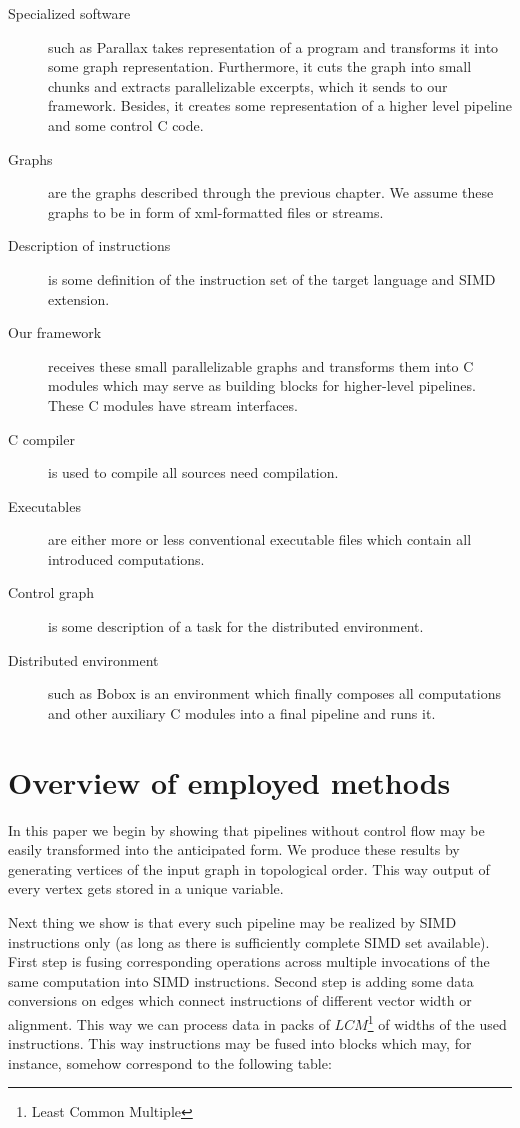 \begin{description}
  \item[Specialized software] such as Parallax takes representation of a program and transforms it into some graph representation. Furthermore, it cuts the graph into small chunks and extracts parallelizable excerpts, which it sends to our framework. Besides, it creates some representation of a higher level pipeline and some control C code.
  \item[Graphs] are the graphs described through the previous chapter. We assume these graphs to be in form of xml-formatted files or streams.
  \item[Description of instructions] is some definition of the instruction set of the target language and SIMD extension. 
  \item[Our framework] receives these small parallelizable graphs and transforms them into C modules which may serve as building blocks for higher-level pipelines. These C modules have stream interfaces.
  \item[C compiler] is used to compile all sources need compilation.
  \item[Executables] are either more or less conventional executable files which contain all introduced computations.
  \item[Control graph] is some description of a task for the distributed environment.
  \item[Distributed environment] such as Bobox \cite{bobox} is an environment which finally composes all computations and other auxiliary C modules into a final pipeline and runs it. 

\end{description}

\section{Overview of employed methods}

In this paper we begin by showing that pipelines without control flow may be easily transformed into the anticipated form. We produce these results by generating vertices of the input graph in topological order. This way output of every vertex gets stored in a unique variable. 

  
Next thing we show is that every such pipeline may be realized by SIMD instructions only (as long as there is sufficiently complete SIMD set available). First step is fusing corresponding operations across multiple invocations of the same computation into SIMD instructions. Second step is adding some data conversions on edges which connect instructions of different vector width or alignment. This way we can process data in packs of $LCM$\footnote{Least Common Multiple} of widths of the used instructions. This way instructions may be fused into blocks which may, for instance, somehow correspond to the following table:


